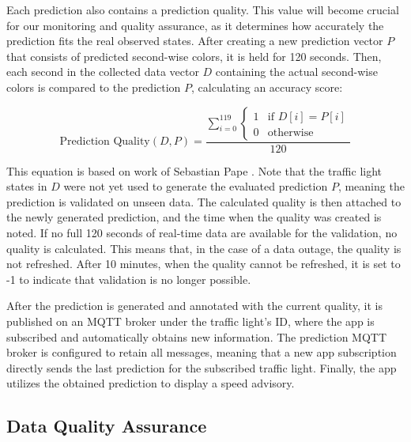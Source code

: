 Each prediction also contains a prediction quality. This value will become crucial for our monitoring and quality assurance, as it determines how accurately the prediction fits the real observed states. After creating a new prediction vector $P$ that consists of predicted second-wise colors, it is held for 120 seconds. Then, each second in the collected data vector $D$ containing the actual second-wise colors is compared to the prediction $P$, calculating an accuracy score:


\begin{equation} 
\text{Prediction Quality}(D, P) = 
\frac{
\sum_{i=0}^{119} 
\left\{
\begin{array}{ll}
1 & \text{if } D[i] = P[i] \\
0 & \text{otherwise}
\end{array} 
\right.
}{
120
}
\end{equation}\label{eq:predictionquality}

This equation is based on work of Sebastian Pape \cite{pape_untersuchung_2012}. Note that the traffic light states in $D$ were not yet used to generate the evaluated prediction $P$, meaning the prediction is validated on unseen data. The calculated quality is then attached to the newly generated prediction, and the time when the quality was created is noted. If no full 120 seconds of real-time data are available for the validation, no quality is calculated. This means that, in the case of a data outage, the quality is not refreshed. After 10 minutes, when the quality cannot be refreshed, it is set to -1 to indicate that validation is no longer possible. 

After the prediction is generated and annotated with the current quality, it is published on an MQTT broker under the traffic light's ID, where the app is subscribed and automatically obtains new information. The prediction MQTT broker is configured to retain all messages, meaning that a new app subscription directly sends the last prediction for the subscribed traffic light. Finally, the app utilizes the obtained prediction to display a speed advisory.

\subsection{Data Quality Assurance}

